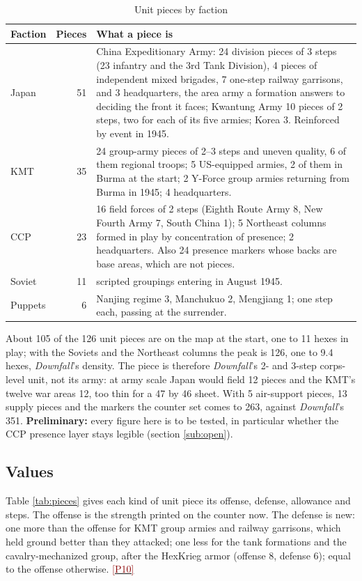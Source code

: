 \documentclass[11pt]{article}
\newcommand{\ptest}[1]{\hyperlink{ptest}{\textcolor{darkred}{[P#1]}}}
\begin{document}
\begin{table}[ht]
\centering\small
\begin{tabular}{@{}lrp{}@{}}
\toprule Faction & Pieces & What a piece is \\\midrule
Japan & 51 & China Expeditionary Army: 24 division pieces of 3 steps (23 infantry and the 3rd Tank Division), 4 pieces of independent mixed brigades, 7 one-step railway garrisons, and 3 headquarters, the area army a formation answers to deciding the front it faces; Kwantung Army 10 pieces of 2 steps, two for each of its five armies; Korea 3. Reinforced by event in 1945.\\
KMT & 35 & 24 group-army pieces of 2--3 steps and uneven quality, 6 of them regional troops; 5 US-equipped armies, 2 of them in Burma at the start; 2 Y-Force group armies returning from Burma in 1945; 4 headquarters.\\
CCP & 23 & 16 field forces of 2 steps (Eighth Route Army 8, New Fourth Army 7, South China 1); 5 Northeast columns formed in play by concentration of presence; 2 headquarters. Also 24 presence markers whose backs are base areas, which are not pieces.\\
Soviet & 11 & scripted groupings entering in August 1945.\\
Puppets & 6 & Nanjing regime 3, Manchukuo 2, Mengjiang 1; one step each, passing at the surrender.\\
\bottomrule
\end{tabular}
\caption{Unit pieces by faction}\label{tab:counts}
\end{table}

About 105 of the 126 unit pieces are on the map at the start, one to 11 hexes in play; with the Soviets and the Northeast columns the peak is 126, one to 9.4 hexes, \emph{Downfall}'s density. The piece is therefore \emph{Downfall}'s 2- and 3-step corps-level unit, not its army: at army scale Japan would field 12 pieces and the KMT's twelve war areas 12, too thin for a 47 by 46 sheet. With 5 air-support pieces, 13 supply pieces and the markers the counter set comes to 263, against \emph{Downfall}'s 351. \textbf{Preliminary:} every figure here is to be tested, in particular whether the CCP presence layer stays legible (section \ref{sub:open}).

\subsection{Values}\label{sub:pieces}
Table \ref{tab:pieces} gives each kind of unit piece its offense, defense, allowance and steps. The offense is the strength printed on the counter now. The defense is new: one more than the offense for KMT group armies and railway garrisons, which held ground better than they attacked; one less for the tank formations and the cavalry-mechanized group, after the HexKrieg armor (offense 8, defense 6); equal to the offense otherwise. \ptest{10}
\end{document}
